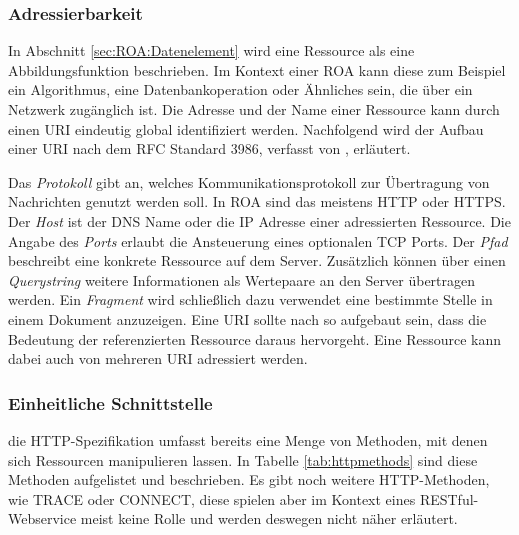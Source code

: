 \subsubsection{Adressierbarkeit}

In Abschnitt \ref{sec:ROA:Datenelement} wird eine Ressource als eine Abbildungsfunktion beschrieben. Im Kontext einer \ac{ROA} kann diese zum Beispiel ein Algorithmus, eine Datenbankoperation oder Ähnliches sein, die über ein Netzwerk zugänglich ist. Die Adresse und der Name einer Ressource kann durch einen \ac{URI} eindeutig global identifiziert werden. Nachfolgend wird der Aufbau einer \ac{URI} nach dem \ac{RFC} Standard 3986, verfasst von \citeauthor{BernersLee1998}, erläutert. 

\begin{center}
\setlength{\fboxrule}{0.2mm}
\setlength{\fboxsep}{2mm}
\end{center}

Das \emph{Protokoll} gibt an, welches Kommunikationsprotokoll zur Übertragung von Nachrichten genutzt werden soll. In \ac{ROA} sind das meistens \ac{HTTP} oder \ac{HTTPS}.
Der \emph{Host} ist der \ac{DNS} Name oder die \ac{IP} Adresse einer adressierten Ressource. Die Angabe des \emph{Ports} erlaubt die Ansteuerung eines optionalen \ac{TCP} Ports. Der \emph{Pfad} beschreibt eine konkrete Ressource auf dem Server. Zusätzlich können über einen \emph{Querystring} weitere Informationen als Wertepaare an den Server übertragen werden. Ein \emph{Fragment} wird schließlich dazu verwendet eine bestimmte Stelle in einem Dokument anzuzeigen.
Eine \ac{URI} sollte nach \citeauthor[83]{Ruby2007} so aufgebaut sein, dass die Bedeutung der referenzierten Ressource daraus hervorgeht. Eine Ressource kann dabei auch von mehreren \ac{URI} adressiert werden.

\subsubsection{Einheitliche Schnittstelle}
\label{sec:ROA:Einheitliche Schnittstelle}

die HTTP-Spezifikation umfasst bereits eine Menge von Methoden, mit denen sich Ressourcen manipulieren lassen. In Tabelle \ref{tab:httpmethods} sind diese Methoden aufgelistet und beschrieben. Es gibt noch weitere HTTP-Methoden, wie TRACE oder CONNECT, diese spielen aber im Kontext eines RESTful-Webservice meist keine Rolle und werden deswegen nicht näher erläutert.

